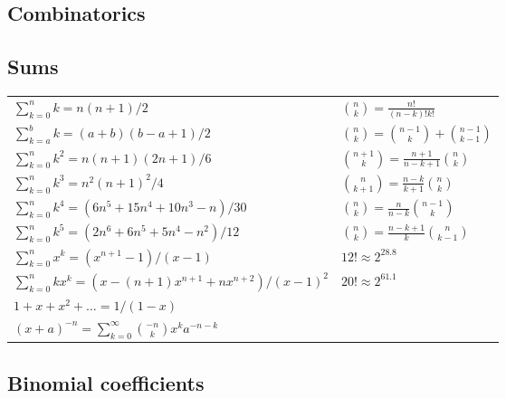 \documentclass[12pt]{extarticle}
\begin{document}
\begin{multicols*}{2}


\section{Combinatorics}

\subsection{Sums}

\begin{tabular}{l l}
    $\sum_{k=0}^n k = n(n+1)/2$		& ${n \choose k} = \frac{n!}{(n-k)!k!}$ \\
    $\sum_{k=a}^b k = (a+b)(b-a+1)/2$   & ${n \choose k} = {n-1 \choose k} + {n-1 \choose k-1}$ \\
    $\sum_{k=0}^n k^2 = n(n+1)(2n+1)/6$ & ${n+1 \choose k} = \frac{n+1}{n-k+1} {n \choose k}$   \\
    $\sum_{k=0}^n k^3 = n^2(n+1)^2/4$   & ${n \choose k+1} = \frac{n-k}{k+1} {n \choose k}$     \\
    $\sum_{k=0}^n k^4 = (6n^5 + 15n^4 + 10n^3 - n)/30$  & ${n \choose k} = \frac{n}{n-k} {n-1 \choose k}$       \\
    $\sum_{k=0}^n k^5 = (2n^6 + 6n^5 + 5n^4 - n^2)/12$  & ${n \choose k} = \frac{n-k+1}{k} {n \choose k-1}$     \\
    $\sum_{k=0}^n x^k = (x^{n+1} - 1)/(x - 1)$  & $12! \approx 2^{28.8}$ \\
    $\sum_{k=0}^n kx^k = (x - (n+1)x^{n+1} + nx^{n+2})/(x-1)^2$	& $20! \approx 2^{61.1}$ \\
    $1 + x + x^2 + \dots = 1 / (1 - x)$ \\
    $(x+a)^{-n} = \sum_{k=0}^{\infty} {-n \choose k} x^k a^{-n-k}$ \\
\end{tabular}


\subsection{Binomial coefficients}


\end{multicols*}
\end{document}
